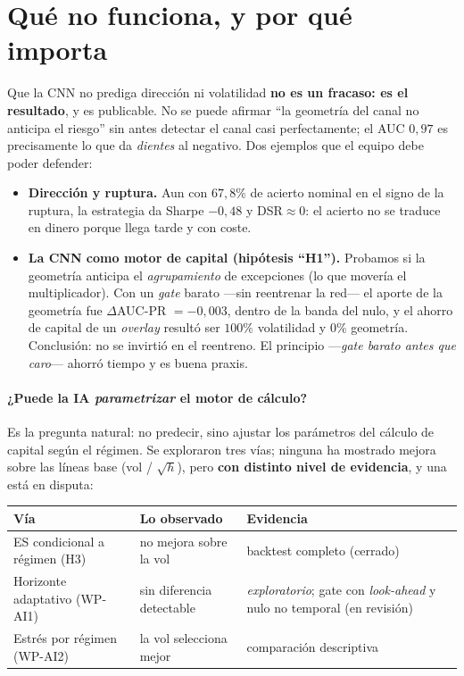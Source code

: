 \documentclass[11pt,a4paper]{article}
\begin{document}
\section{Qué no funciona, y por qué importa}\label{sec:nofunciona}
Que la CNN no prediga dirección ni volatilidad \textbf{no es un fracaso: es el
resultado}, y es publicable. No se puede afirmar ``la geometría del canal no
anticipa el riesgo'' sin antes detectar el canal casi perfectamente; el AUC
$0{,}97$ es precisamente lo que da \emph{dientes} al negativo. Dos ejemplos que el
equipo debe poder defender:
\begin{itemize}\itemsep2pt
\item \textbf{Dirección y ruptura.} Aun con $67{,}8\%$ de acierto nominal en el
signo de la ruptura, la estrategia da Sharpe $-0{,}48$ y DSR$\approx 0$: el
acierto no se traduce en dinero porque llega tarde y con coste.
\item \textbf{La CNN como motor de capital (hipótesis ``H1'').} Probamos si la
geometría anticipa el \emph{agrupamiento} de excepciones (lo que movería el
multiplicador). Con un \emph{gate} barato ---sin reentrenar la red--- el aporte de
la geometría fue $\Delta$AUC-PR $=-0{,}003$, dentro de la banda del nulo, y el
ahorro de capital de un \emph{overlay} resultó ser $100\%$ volatilidad y $0\%$
geometría. Conclusión: no se invirtió en el reentreno. El principio ---\emph{gate
barato antes que caro}--- ahorró tiempo y es buena praxis.
\end{itemize}

\paragraph{¿Puede la IA \emph{parametrizar} el motor de cálculo?} Es la pregunta
natural: no predecir, sino ajustar los parámetros del cálculo de capital según el
régimen. Se exploraron tres vías; ninguna ha mostrado mejora sobre las líneas base
(vol / $\sqrt{h}$), pero \textbf{con distinto nivel de evidencia}, y una está en
disputa:

\begin{table}[H]\centering\footnotesize
\begin{tabularx}{\linewidth}{L L l}
\toprule
Vía & Lo observado & Evidencia\\
\midrule
ES condicional a régimen (H3)        & no mejora sobre la vol & backtest completo (cerrado)\\
Horizonte adaptativo (WP-AI1)        & sin diferencia detectable & \emph{exploratorio}; gate con \emph{look-ahead} y nulo no temporal (en revisión)\\
Estrés por régimen (WP-AI2)          & la vol selecciona mejor & comparación descriptiva\\
\bottomrule
\end{tabularx}
\end{table}
\end{document}
